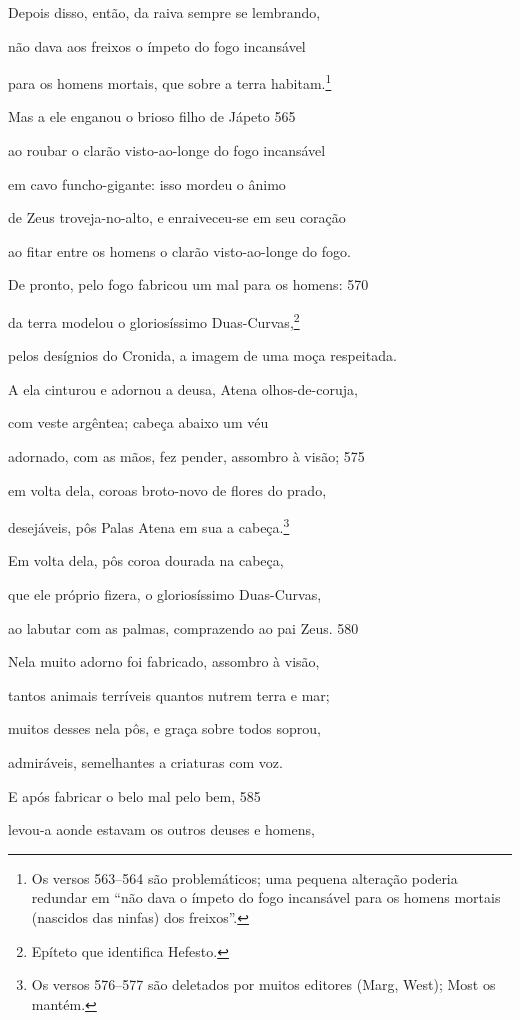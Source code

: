 Depois disso, então, da raiva sempre se lembrando,

não dava aos freixos o ímpeto do fogo incansável

para os homens mortais, que sobre a terra habitam.\footnote{Os versos 563--564 são problemáticos; uma pequena alteração poderia redundar em
``não dava o ímpeto do fogo incansável para os homens mortais (nascidos
das ninfas) dos freixos''.}

Mas a ele enganou o brioso filho de Jápeto \num{565}

ao roubar o clarão visto-ao-longe do fogo incansável

em cavo funcho-gigante: isso mordeu o ânimo

de Zeus troveja-no-alto, e enraiveceu-se em seu coração

ao fitar entre os homens o clarão visto-ao-longe do fogo.

De pronto, pelo fogo fabricou um mal para os homens: \num{570}

da terra modelou o gloriosíssimo Duas-Curvas,\footnote{Epíteto que identifica Hefesto.}

pelos desígnios do Cronida, a imagem de uma moça respeitada.

A ela cinturou e adornou a deusa, Atena olhos-de-coruja,

com veste argêntea; cabeça abaixo um véu

adornado, com as mãos, fez pender, assombro à visão; \num{575}

em volta dela, coroas broto-novo de flores do prado,

desejáveis, pôs Palas Atena em sua a cabeça.\footnote{Os versos 576--577 são deletados por muitos editores (Marg, West); Most os mantém.}

Em volta dela, pôs coroa dourada na cabeça,

que ele próprio fizera, o gloriosíssimo Duas-Curvas,

ao labutar com as palmas, comprazendo ao pai Zeus. \num{580}

Nela muito adorno foi fabricado, assombro à visão,

tantos animais terríveis quantos nutrem terra e mar;

muitos desses nela pôs, e graça sobre todos soprou,

admiráveis, semelhantes a criaturas com voz.

\quad{}E após fabricar o belo mal pelo bem, \num{585}

levou-a aonde estavam os outros deuses e homens,

